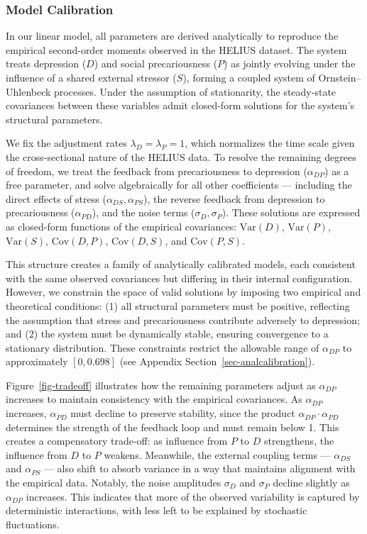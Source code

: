 \documentclass[
]{article}
\begin{document}
\subsubsection{Model Calibration}\label{sec-calibration}

In our linear model, all parameters are derived analytically to
reproduce the empirical second-order moments observed in the HELIUS
dataset. The system treats depression (\(D\)) and social precariousness
(\(P\)) as jointly evolving under the influence of a shared external
stressor (\(S\)), forming a coupled system of Ornstein--Uhlenbeck
processes. Under the assumption of stationarity, the steady-state
covariances between these variables admit closed-form solutions for the
system's structural parameters.

We fix the adjustment rates \(\lambda_D = \lambda_P = 1\), which
normalizes the time scale given the cross-sectional nature of the HELIUS
data. To resolve the remaining degrees of freedom, we treat the feedback
from precariousness to depression (\(\alpha_{DP}\)) as a free parameter,
and solve algebraically for all other coefficients --- including the
direct effects of stress (\(\alpha_{DS}, \alpha_{PS}\)), the reverse
feedback from depression to precariousness (\(\alpha_{PD}\)), and the
noise terms (\(\sigma_D, \sigma_P\)). These solutions are expressed as
closed-form functions of the empirical covariances: \(\mathrm{Var}(D)\),
\(\mathrm{Var}(P)\), \(\mathrm{Var}(S)\), \(\mathrm{Cov}(D, P)\),
\(\mathrm{Cov}(D, S)\), and \(\mathrm{Cov}(P, S)\).

This structure creates a family of analytically calibrated models, each
consistent with the same observed covariances but differing in their
internal configuration. However, we constrain the space of valid
solutions by imposing two empirical and theoretical conditions: (1) all
structural parameters must be positive, reflecting the assumption that
stress and precariousness contribute adversely to depression; and (2)
the system must be dynamically stable, ensuring convergence to a
stationary distribution. These constraints restrict the allowable range
of \(\alpha_{DP}\) to approximately \([0, 0.698]\) (see Appendix
Section~\ref{sec-analcalibration}).

Figure~\ref{fig-tradeoff} illustrates how the remaining parameters
adjust as \(\alpha_{DP}\) increases to maintain consistency with the
empirical covariances. As \(\alpha_{DP}\) increases, \(\alpha_{PD}\)
must decline to preserve stability, since the product
\(\alpha_{DP} \cdot \alpha_{PD}\) determines the strength of the
feedback loop and must remain below 1. This creates a compensatory
trade-off: as influence from \(P\) to \(D\) strengthens, the influence
from \(D\) to \(P\) weakens. Meanwhile, the external coupling terms ---
\(\alpha_{DS}\) and \(\alpha_{PS}\) --- also shift to absorb variance in
a way that maintains alignment with the empirical data. Notably, the
noise amplitudes \(\sigma_D\) and \(\sigma_P\) decline slightly as
\(\alpha_{DP}\) increases. This indicates that more of the observed
variability is captured by deterministic interactions, with less left to
be explained by stochastic fluctuations.
\end{document}

